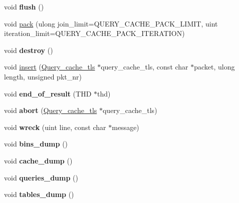 \begin{DoxyCompactItemize}
void {\bfseries flush} ()
\item 
void \mbox{\hyperlink{classQuery__cache_a0f90dda21146e016edb908c7a74fe846}{pack}} (ulong join\+\_\+limit=Q\+U\+E\+R\+Y\+\_\+\+C\+A\+C\+H\+E\+\_\+\+P\+A\+C\+K\+\_\+\+L\+I\+M\+IT, uint iteration\+\_\+limit=Q\+U\+E\+R\+Y\+\_\+\+C\+A\+C\+H\+E\+\_\+\+P\+A\+C\+K\+\_\+\+I\+T\+E\+R\+A\+T\+I\+ON)
\item 
\mbox{\label{classQuery__cache_ac085384ba3e450ea57bd7451eb8bf4fb}} 
void {\bfseries destroy} ()
\item 
void \mbox{\hyperlink{classQuery__cache_a965d2c25ed3393f9331db62131a26491}{insert}} (\mbox{\hyperlink{structQuery__cache__tls}{Query\+\_\+cache\+\_\+tls}} $\ast$query\+\_\+cache\+\_\+tls, const char $\ast$packet, ulong length, unsigned pkt\+\_\+nr)
\item 
\mbox{\label{classQuery__cache_a08fdc14991052f46fd05e66f24f41d06}} 
void {\bfseries end\+\_\+of\+\_\+result} (T\+HD $\ast$thd)
\item 
\mbox{\label{classQuery__cache_aa18f02b2ad00fe95615c7680fb9e950e}} 
void {\bfseries abort} (\mbox{\hyperlink{structQuery__cache__tls}{Query\+\_\+cache\+\_\+tls}} $\ast$query\+\_\+cache\+\_\+tls)
\item 
\mbox{\label{classQuery__cache_ae9781fdcc31918a7db54a082489e078b}} 
void {\bfseries wreck} (uint line, const char $\ast$message)
\item 
\mbox{\label{classQuery__cache_a9195bcf86b947d30b25ba1b306ce3cee}} 
void {\bfseries bins\+\_\+dump} ()
\item 
\mbox{\label{classQuery__cache_ab1d0d23b5b9b3f3179bee004b1a8b6ed}} 
void {\bfseries cache\+\_\+dump} ()
\item 
\mbox{\label{classQuery__cache_a22277ca34cecfc45c5cc9f93e4fde865}} 
void {\bfseries queries\+\_\+dump} ()
\item 
\mbox{\label{classQuery__cache_a92e1548765c72db16455788091fbce0c}} 
void {\bfseries tables\+\_\+dump} ()
\item 
\mbox{\label{classQuery__cache_a7becb2465433997c2133306b7ee1b445}} 

\end{DoxyCompactItemize}
